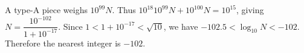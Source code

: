 A type-A piece weighs $10^{99}N$. Thus $10^{18}10^{99}N+10^{100}N=10^{15}$, giving $N=\dfrac{10^{-102}}{1+10^{-17}}$. Since $1<1+10^{-17}<\sqrt{10}$, we have $-102.5<\log_{10}N<-102$. Therefore the nearest integer is $\boxed{-102}$.
